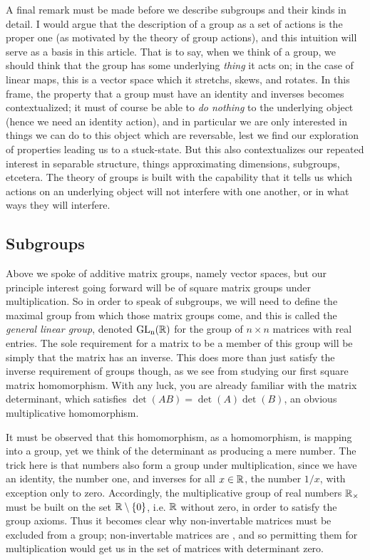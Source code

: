 \documentclass[11pt]{article}
\begin{document}
A final remark must be made before we describe subgroups and their kinds in detail. I would argue that the description of a group as a set of actions is the proper one (as motivated by the theory of group actions), and this intuition will serve as a basis in this article. That is to say, when we think of a group, we should think that the group has some underlying \emph{thing} it acts on; in the case of linear maps, this is a vector space which it stretchs, skews, and rotates. In this frame, the property that a group must have an identity and inverses becomes contextualized; it must of course be able to \emph{do nothing} to the underlying object (hence we need an identity action), and in particular we are only interested in things we can do to this object which are reversable, lest we find our exploration of properties leading us to a stuck-state. But this also contextualizes our repeated interest in separable structure, things approximating dimensions, subgroups, etcetera. The theory of groups is built with the capability that it tells us which actions on an underlying object will not interfere with one another, or in what ways they will interfere. 

\subsection{Subgroups}

Above we spoke of additive matrix groups, namely vector spaces, but our principle interest going forward will be of square matrix groups under multiplication. So in order to speak of subgroups, we will need to define the maximal group from which those matrix groups come, and this is called the \emph{general linear group}, denoted $\mathrm{GL_n(\mathbb{R})}$ for the group of $n\times n$ matrices with real entries. The sole requirement for a matrix to be a member of this group will be simply that the matrix has an inverse. This does more than just satisfy the inverse requirement of groups though, as we see from studying our first square matrix homomorphism. With any luck, you are already familiar with the matrix determinant, which satisfies $\det(AB) = \det(A) \det(B)$, an obvious multiplicative homomorphism.

It must be observed that this homomorphism, as a homomorphism, is mapping into a group, yet we think of the determinant as producing a mere number. The trick here is that numbers also form a group under multiplication, since we have an identity, the number one, and inverses for all $x \in \mathbb{R}$, the number $1/x$, with exception only to zero. Accordingly, the multiplicative group of real numbers $\mathbb{R}_\times$ must be built on the set $\mathbb{R} \setminus\{0\}$, i.e. $\mathbb{R}$ without zero, in order to satisfy the group axioms. Thus it becomes clear why non-invertable matrices must be excluded from a group; non-invertable matrices are , and so permitting them for multiplication would get us  in the set of matrices with determinant zero.
\end{document}
